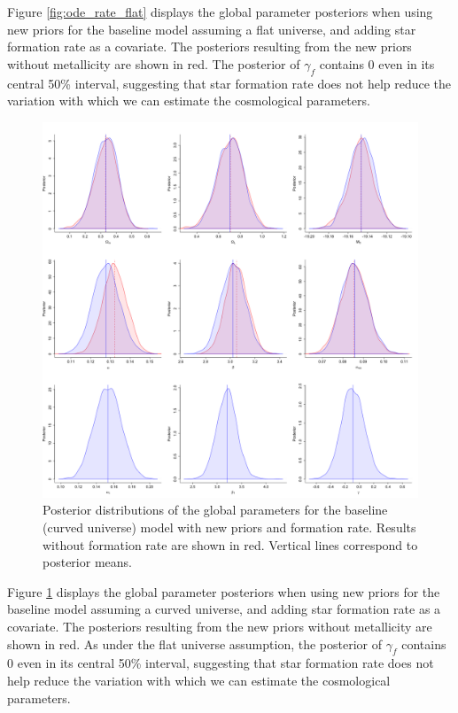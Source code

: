 Figure \ref{fig:ode_rate_flat} displays the global parameter posteriors when using new priors for the baseline model assuming a flat universe, and adding star formation rate as a covariate. The posteriors resulting from the new priors without metallicity are shown in red. The posterior of $\gamma_{f}$ contains 0 even in its central 50\% interval, suggesting that star formation rate does not help reduce the variation with which we can estimate the cosmological parameters.

\begin{figure}
\centering
	\includegraphics[width=\textwidth]{figures/ode/split_rate_curv_camp.png}
\caption{Posterior distributions of the global parameters for the baseline (curved universe) model with new priors and formation rate. Results without formation rate are shown in red. Vertical lines correspond to posterior means.}
\label{fig:ode_rate_curv}
\end{figure}

Figure \ref{fig:ode_rate_curv} displays the global parameter posteriors when using new priors for the baseline model assuming a curved universe, and adding star formation rate as a covariate. The posteriors resulting from the new priors without metallicity are shown in red. As under the flat universe assumption, the posterior of $\gamma_{f}$ contains 0 even in its central 50\% interval, suggesting that star formation rate does not help reduce the variation with which we can estimate the cosmological parameters.

